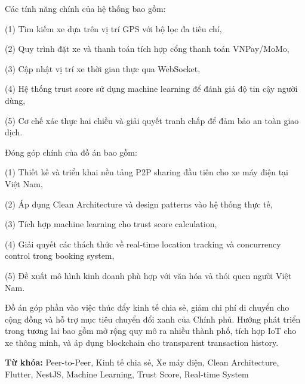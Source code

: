 Các tính năng chính của hệ thống bao gồm: 

(1) Tìm kiếm xe dựa trên vị trí GPS với bộ lọc đa tiêu chí, 

(2) Quy trình đặt xe và thanh toán tích hợp cổng thanh toán VNPay/MoMo, 

(3) Cập nhật vị trí xe thời gian thực qua WebSocket, 

(4) Hệ thống trust score sử dụng machine learning để đánh giá độ tin cậy người dùng, 

(5) Cơ chế xác thực hai chiều và giải quyết tranh chấp để đảm bảo an toàn giao dịch.

\newpage
\thispagestyle{empty}
Đóng góp chính của đồ án bao gồm: 

(1) Thiết kế và triển khai nền tảng P2P sharing đầu tiên cho xe máy điện tại Việt Nam, 

(2) Áp dụng Clean Architecture và design patterns vào hệ thống thực tế, 

(3) Tích hợp machine learning cho trust score calculation, 

(4) Giải quyết các thách thức về real-time location tracking và concurrency control trong booking system, 

(5) Đề xuất mô hình kinh doanh phù hợp với văn hóa và thói quen người Việt Nam.

Đồ án góp phần vào việc thúc đẩy kinh tế chia sẻ, giảm chi phí di chuyển cho cộng đồng và hỗ trợ mục tiêu chuyển đổi xanh của Chính phủ. 
Hướng phát triển trong tương lai bao gồm mở rộng quy mô ra nhiều thành phố, tích hợp IoT cho xe thông minh, và áp dụng blockchain cho transparent transaction history.

\vspace{0.5cm}

\noindent\textbf{Từ khóa:} Peer-to-Peer, Kinh tế chia sẻ, Xe máy điện, Clean Architecture, Flutter, NestJS, Machine Learning, Trust Score, Real-time System
